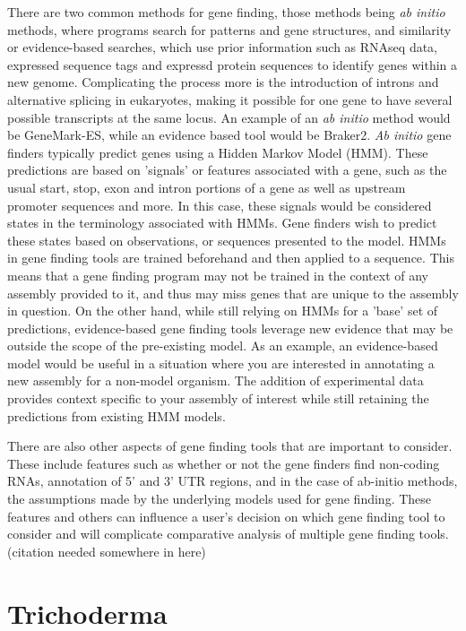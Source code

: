 There are two common methods for gene finding, those methods being
\textit{ab initio} methods, where programs search for patterns and
gene structures, and similarity or evidence-based searches, which use
prior information such as RNAseq data, expressed sequence tags and
expressd protein sequences to identify genes within a new
genome\cite{Ejigu2020}. Complicating the process more is the
introduction of introns and alternative splicing in eukaryotes, making
it possible for one gene to have several possible transcripts at the
same locus. An example of an \textit{ab initio} method would be
GeneMark-ES\cite{10.1093/nar/gki937}, while an evidence based tool
would be Braker2\cite{Bruna2021}.
\textit{Ab initio} gene finders typically predict genes using a Hidden
Markov Model (HMM)\cite{Ejigu2020}. These predictions are based on
'signals' or features associated with a gene, such as the usual start,
stop, exon and intron portions of a gene as well as upstream promoter
sequences and more. In this case, these signals would be considered
states in the terminology associated with HMMs. Gene finders wish to
predict these states based on observations, or sequences presented to
the model. HMMs in gene finding tools are trained beforehand and then
applied to a sequence. This means that a gene finding program may not
be trained in the context of any assembly provided to it, and thus may
miss genes that are unique to the assembly in question.
On the other hand, while still relying on HMMs for a 'base' set of
predictions, evidence-based gene finding tools leverage new evidence
that may be outside the scope of the pre-existing
model\cite{Keller2011}.  As an example, an evidence-based model would
be useful in a situation where you are interested in annotating a new
assembly for a non-model organism. The addition of experimental data
provides context specific to your assembly of interest while still
retaining the predictions from existing HMM models.

There are also other aspects of gene finding tools that are important
to consider. These include features such as whether or not the gene
finders find non-coding RNAs, annotation of 5' and 3' UTR regions, and
in the case of ab-initio methods, the assumptions made by the
underlying models used for gene finding. These features and others can
influence a user's decision on which gene finding tool to consider and
will complicate comparative analysis of multiple gene finding
tools. (citation needed somewhere in here)

\section{Trichoderma}

